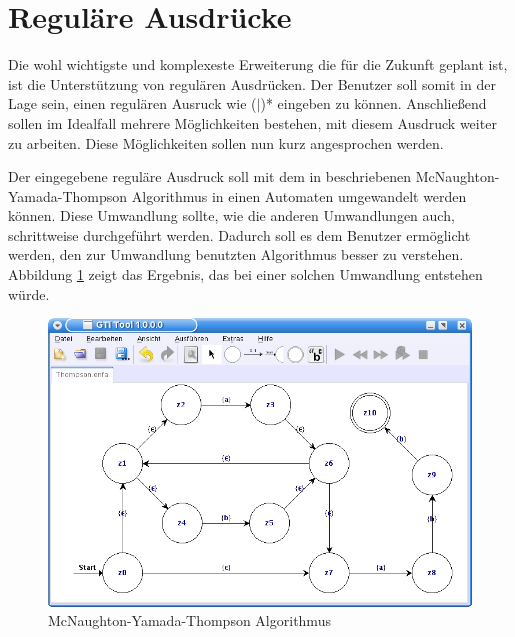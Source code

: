 \section{Reguläre Ausdrücke}

Die wohl wichtigste und komplexeste Erweiterung die für die Zukunft geplant
ist, ist die Unterstützung von regulären Ausdrücken. Der Benutzer soll somit in
der Lage sein, einen regulären Ausruck wie
($\mid$)* eingeben zu können.
Anschließend sollen im Idealfall mehrere Möglichkeiten bestehen, mit diesem
Ausdruck weiter zu arbeiten. Diese Möglichkeiten sollen nun kurz angesprochen
werden.\vspace{10pt}

Der eingegebene reguläre Ausdruck soll mit dem in \cite[S.159ff]{Compilers}
beschriebenen McNaughton-Yamada-Thompson Algorithmus in einen Automaten
umgewandelt werden können. Diese Umwandlung sollte, wie die anderen Umwandlungen
auch, schrittweise durchgeführt werden. Dadurch soll es dem Benutzer ermöglicht
werden, den zur Umwandlung benutzten Algorithmus besser zu verstehen. Abbildung
\ref{FigureThompson} zeigt das Ergebnis, das bei einer solchen Umwandlung
entstehen würde.\vspace{10pt}

\begin{figure}[h!]
\begin{center}
\includegraphics[width=12cm]{../images/thompson.png}
\caption{McNaughton-Yamada-Thompson Algorithmus}
\label{FigureThompson}
\end{center}
\end{figure}
\vspace{10pt}

